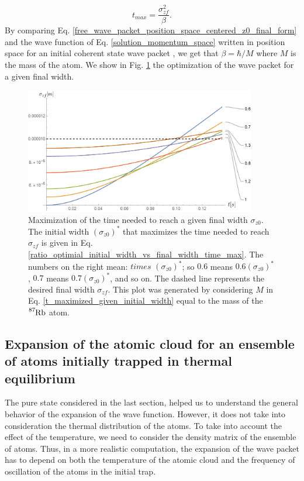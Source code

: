 \documentclass{article}
\begin{document}
\begin{equation}\label{t_maximized_given_initial_width}
    t_{max} = \frac{\sigma_{zf} ^ 2}{\beta}.
\end{equation}
%
By comparing Eq. \ref{free_wave_packet_position_space_centered_z0_final_form} and the wave function of Eq. \ref{solution_momentum_space} written in position space for an initial coherent state wave packet \cite{Castanos2014}, we get that $\beta = \hbar / M$ where $M$ is the mass of the atom. We show in Fig. \ref{optimization_expansion_width} the optimization of the wave packet for a given final width.

\begin{figure}
\centering
\includegraphics[width=0.9\textwidth]{maximize_expansion_time.png}
\caption{Maximization of the time needed to reach a given final width  $\sigma_{z0}$. The initial width $(\sigma_{z0})^{\ast}$ that maximizes the time needed to reach $\sigma_{zf}$ is given in Eq. \ref{ratio_optimial_initial_width_vs_final_width_time_max}. The numbers on the right mean: $times$ $(\sigma_{z0})^{\ast}$; so $0.6$ means $0.6(\sigma_{z0})^{\ast}$, $0.7$ means $0.7(\sigma_{z0})^{\ast}$, and so on. The dashed line represents the desired final width $\sigma_{zf}$. This plot was generated by considering $M$ in Eq. \ref{t_maximized_given_initial_width} equal to the mass of the $\ce{^{87}_{}Rb}$ atom.}
\label{optimization_expansion_width}
\end{figure}

\subsection{Expansion of the atomic cloud for an ensemble of atoms initially trapped in thermal equilibrium}
The pure state considered in the last section, helped us to understand the general behavior of the expansion of the wave function. However, it does not take into consideration the thermal distribution of the atoms. To take into account the effect of the temperature, we need to consider the density matrix of the ensemble of atoms. Thus, in a more realistic computation, the expansion of the wave packet has to depend on both the temperature of the atomic cloud and the frequency of oscillation of the atoms in the initial trap.
\end{document}
